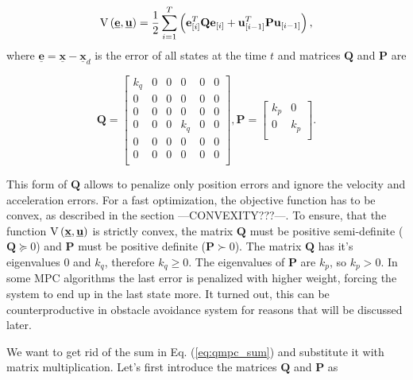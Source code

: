 \documentclass[a4paper,11pt,titlepage]{article}
\newcommand{\uvec}{\textbf{\underline{u}}}
\begin{document}
\begin{equation}
\label{eq:qmpc_sum}
\mathrm{V}\left(\textbf{\underline{e}}, \uvec\right) = \frac{1}{2}\sum_{i=1}^{T}\left(\textbf{e}^T_{[i]}\textbf{Q}\textbf{e}_{[i]} + \textbf{u}^T_{[i-1]}\textbf{P}\textbf{u}_{[i-1]}\right),
\end{equation}
where $\underline{\textbf{e}} = \underline{\textbf{x}} - \underline{\textbf{x}}_d$ is the error of all states at the time $t$  and matrices $\textbf{Q}$ and $\textbf{P}$ are

\begin{equation}
\label{eq:qmpc_weighting_matrices_simple}
\textbf{Q} = \begin{bmatrix}
k_q & 0 & 0 & 0 & 0 & 0 \\
0 & 0 & 0 & 0 & 0 & 0 \\
0 & 0 & 0 & 0 & 0 & 0 \\
0 & 0 & 0 & k_q & 0 & 0 \\
0 & 0 & 0 & 0 & 0 & 0 \\
0 & 0 & 0 & 0 & 0 & 0 \\
\end{bmatrix}, 
\textbf{P} = \begin{bmatrix}
k_p & 0\\
0 & k_p\\
\end{bmatrix}.
\end{equation}

This form of $\textbf{Q}$ allows to penalize only position errors and ignore the velocity and acceleration errors. For a fast optimization, the objective function has to be convex, as described in the section ---CONVEXITY???---. To ensure, that the function $\mathrm{V}\left(\textbf{\underline{x}}, \uvec\right)$ is strictly convex, the matrix $\textbf{Q}$ must be positive semi-definite ($\textbf{Q} \succeq 0$) and $\textbf{P}$ must be positive definite ($\textbf{P} \succ 0$). The matrix $\textbf{Q}$ has it's eigenvalues $0$ and $k_q$, therefore $k_q \geq 0$. The eigenvalues of $\textbf{P}$ are $k_p$, so $k_p > 0$. In some MPC algorithms the last error is penalized with higher weight, forcing the system to end up in the last state more. It turned out, this can be counterproductive in obstacle avoidance system for reasons that will be discussed later.

We want to get rid of the sum in Eq. (\ref{eq:qmpc_sum}) and substitute it with matrix multiplication. Let's first introduce the matrices $\textbf{\^Q}$ and $\textbf{\^P}$ as 
\end{document}
